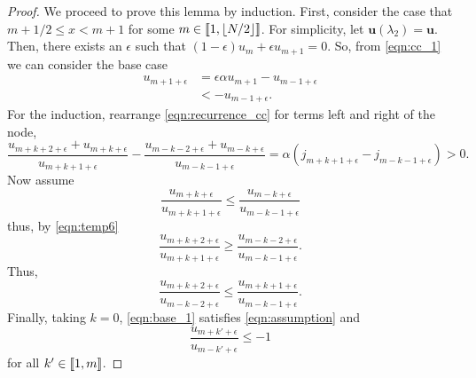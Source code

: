     \begin{proof}
      We proceed to prove this lemma by induction. First, consider the case that $m+1/2 \leq x < m+1$ for some $m\in \left \llbracket 1 , \lfloor N/2 \rfloor \right \rrbracket$. For simplicity, let $\mathbf{u}(\lambda_2) = \mathbf{u}$. Then, there exists an $\epsilon$ such that $(1-\epsilon)u_{m}+\epsilon u_{m+1}=0$. So, from \cref{eqn:cc_1} we can consider the base case
      \begin{align}\label{eqn:base_1}
	u_{m+1+\epsilon} &= \epsilon \alpha u_{m+1} - u_{m-1+\epsilon} \\
	&< -u_{m-1+\epsilon}.
      \end{align}
      For the induction, rearrange \cref{eqn:recurrence_cc} for terms left and right of the node,
      \begin{equation}\label{eqn:temp6}
      	\frac{u_{m+k+2+\epsilon}+u_{m+k+\epsilon}}{u_{m+k+1+\epsilon}} - \frac{u_{m-k-2+\epsilon}+u_{m-k+\epsilon}}{u_{m-k-1+\epsilon}} = \alpha(j_{m+k+1+\epsilon}-j_{m-k-1+\epsilon}) > 0.
      \end{equation}
      Now assume
      \begin{equation}\label{eqn:assumption}
      	\frac{u_{m+k+\epsilon}}{u_{m+k+1+\epsilon}} \leq \frac{u_{m-k+\epsilon}}{u_{m-k-1+\epsilon}}
      \end{equation}
      thus, by \cref{eqn:temp6}
      \begin{equation}
      	\frac{u_{m+k+2+\epsilon}}{u_{m+k+1+\epsilon}} \geq \frac{u_{m-k-2+\epsilon}}{u_{m-k-1+\epsilon}}.
      \end{equation}
      Thus,
      \begin{equation}
      	\frac{u_{m+k+2+\epsilon}}{u_{m-k-2+\epsilon}} \leq \frac{u_{m+k+1+\epsilon}}{u_{m-k-1+\epsilon}}.
      \end{equation}
      Finally, taking $k=0$, \cref{eqn:base_1} satisfies \cref{eqn:assumption} and
      \begin{equation}
      	\frac{u_{m+k'+\epsilon}}{u_{m-k'+\epsilon}} \leq -1
      \end{equation}
      for all $k' \in \left \llbracket 1 , m \right \rrbracket$.


\end{proof}
